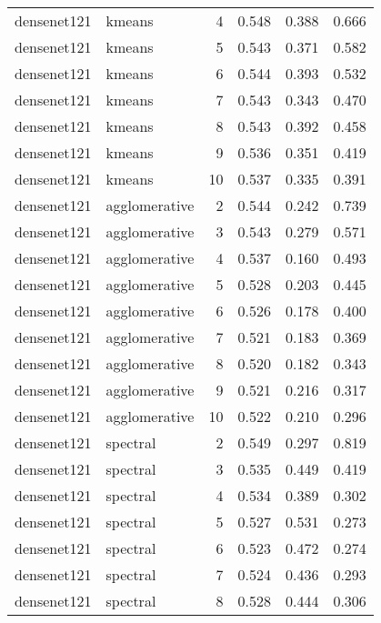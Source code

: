 \begin{longtable}{llrrrr}
densenet121 &        kmeans &  4 &            0.548 &   0.388 &    0.666 \\
densenet121 &        kmeans &  5 &            0.543 &   0.371 &    0.582 \\
densenet121 &        kmeans &  6 &            0.544 &   0.393 &    0.532 \\
densenet121 &        kmeans &  7 &            0.543 &   0.343 &    0.470 \\
densenet121 &        kmeans &  8 &            0.543 &   0.392 &    0.458 \\
densenet121 &        kmeans &  9 &            0.536 &   0.351 &    0.419 \\
densenet121 &        kmeans & 10 &            0.537 &   0.335 &    0.391 \\
densenet121 & agglomerative &  2 &            0.544 &   0.242 &    0.739 \\
densenet121 & agglomerative &  3 &            0.543 &   0.279 &    0.571 \\
densenet121 & agglomerative &  4 &            0.537 &   0.160 &    0.493 \\
densenet121 & agglomerative &  5 &            0.528 &   0.203 &    0.445 \\
densenet121 & agglomerative &  6 &            0.526 &   0.178 &    0.400 \\
densenet121 & agglomerative &  7 &            0.521 &   0.183 &    0.369 \\
densenet121 & agglomerative &  8 &            0.520 &   0.182 &    0.343 \\
densenet121 & agglomerative &  9 &            0.521 &   0.216 &    0.317 \\
densenet121 & agglomerative & 10 &            0.522 &   0.210 &    0.296 \\
densenet121 &      spectral &  2 &            0.549 &   0.297 &    0.819 \\
densenet121 &      spectral &  3 &            0.535 &   0.449 &    0.419 \\
densenet121 &      spectral &  4 &            0.534 &   0.389 &    0.302 \\
densenet121 &      spectral &  5 &            0.527 &   0.531 &    0.273 \\
densenet121 &      spectral &  6 &            0.523 &   0.472 &    0.274 \\
densenet121 &      spectral &  7 &            0.524 &   0.436 &    0.293 \\
densenet121 &      spectral &  8 &            0.528 &   0.444 &    0.306 \\

\end{longtable}
